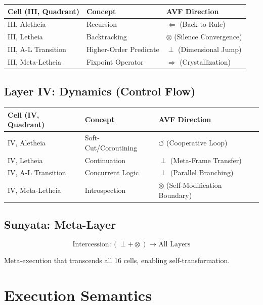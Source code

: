 \documentclass[12pt,a4paper]{article}
\theoremstyle{definition}
\begin{document}
\begin{table}[h]
\centering
\small
\begin{tabular}{|l|l|l|}
\hline
\textbf{Cell (III, Quadrant)} & \textbf{Concept} & \textbf{AVF Direction} \\
\hline
III, Aletheia & Recursion & $\Leftarrow$ (Back to Rule) \\
III, Letheia & Backtracking & $\otimes$ (Silence Convergence) \\
III, A-L Transition & Higher-Order Predicate & $\perp$ (Dimensional Jump) \\
III, Meta-Letheia & Fixpoint Operator & $\Rightarrow$ (Crystallization) \\
\hline
\end{tabular}
\end{table}

\subsection{Layer IV: Dynamics (Control Flow)}

\begin{table}[h]
\centering
\small
\begin{tabular}{|l|l|l|}
\hline
\textbf{Cell (IV, Quadrant)} & \textbf{Concept} & \textbf{AVF Direction} \\
\hline
IV, Aletheia & Soft-Cut/Coroutining & $\circlearrowleft$ (Cooperative Loop) \\
IV, Letheia & Continuation & $\perp$ (Meta-Frame Transfer) \\
IV, A-L Transition & Concurrent Logic & $\perp$ (Parallel Branching) \\
IV, Meta-Letheia & Introspection & $\otimes$ (Self-Modification Boundary) \\
\hline
\end{tabular}
\end{table}

\subsection{Sunyata: Meta-Layer}

\begin{equation}
\text{Intercession} : (\perp + \otimes) \to \text{All Layers}
\end{equation}

Meta-execution that transcends all 16 cells, enabling self-transformation.

\section{Execution Semantics}
\end{document}
